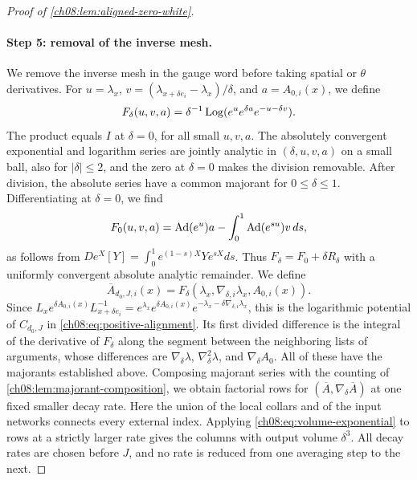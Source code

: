 \begin{proof}[Proof of \cref{ch08:lem:aligned-zero-white}]
\paragraph{Step 5: removal of the inverse mesh.}
We remove the inverse mesh in the gauge word before taking spatial or $\theta$ derivatives. For $u=\lambda_x$, $v=(\lambda_{x+\delta e_i}-\lambda_x)/\delta$, and $a=A_{0,i}(x)$, we define
\begin{equation}\label{ch08:eq:removable-alignment}
 F_\delta(u,v,a)=\delta^{-1}
              \operatorname{Log}(e^u e^{\delta a}e^{-u-\delta v}).
\end{equation}
The product equals $I$ at $\delta=0$, for all small $u,v,a$. The absolutely convergent exponential and logarithm series are jointly analytic in $(\delta,u,v,a)$ on a small ball, also for $|\delta|\le2$, and the zero at $\delta=0$ makes the division removable. After division, the absolute series have a common majorant for $0\le\delta\le1$. Differentiating at $\delta=0$, we find
\begin{equation}\label{ch08:eq:alignment-zero-mesh}
 F_0(u,v,a)=\operatorname{Ad}(e^u)a-\int_0^1\operatorname{Ad}(e^{su})v\,ds,
\end{equation}
as follows from $De^X[Y]=\int_0^1e^{(1-s)X}Ye^{sX}ds$. Thus $F_\delta=F_0+\delta R_\delta$ with a uniformly convergent absolute analytic remainder. We define
\[
 \overline A_{d_0,J,i}(x)=
                 F_\delta(\lambda_x,\nabla_{\delta,i}\lambda_x,A_{0,i}(x)).
\]
Since $L_xe^{\delta A_{0,i}(x)}L_{x+\delta e_i}^{-1}=e^{\lambda_x}e^{\delta A_{0,i}(x)}e^{-\lambda_x-\delta\nabla_{\delta,i}\lambda_x}$, this is the logarithmic potential of $C_{d_0,J}$ in \eqref{ch08:eq:positive-alignment}. Its first divided difference is the integral of the derivative of $F_\delta$ along the segment between the neighboring lists of arguments, whose differences are $\nabla_\delta\lambda$, $\nabla_\delta^2\lambda$, and $\nabla_\delta A_0$. All of these have the majorants established above. Composing majorant series with the counting of \cref{ch08:lem:majorant-composition}, we obtain factorial rows for $(\overline A,\nabla_\delta\overline A)$ at one fixed smaller decay rate. Here the union of the local collars and of the input networks connects every external index. Applying \eqref{ch08:eq:volume-exponential} to rows at a strictly larger rate gives the columns with output volume $\delta^3$. All decay rates are chosen before $J$, and no rate is reduced from one averaging step to the next.


\end{proof}
